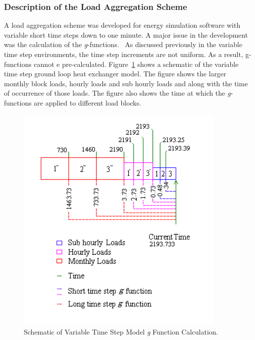 \subsubsection{Description of the Load Aggregation Scheme}\label{description-of-the-load-aggregation-scheme}

A load aggregation scheme was developed for energy simulation software with variable short time steps down to one minute. A major issue in the development was the calculation of the \emph{g}-functions.~ As discussed previously in the variable time step environments, the time step increments are not uniform. As a result, g-functions cannot e pre-calculated. Figure~\ref{fig:schematic-of-variable-time-step-model-g} shows a schematic of the variable time step ground loop heat exchanger model. The figure shows the larger monthly block loads, hourly loads and sub hourly loads and along with the time of occurrence of those loads. The figure also shows the time at which the \emph{g}-functions are applied to different load blocks.

\begin{figure}[hbtp] %
\centering
\includegraphics[width=0.9\textwidth, height=0.9\textheight, keepaspectratio=true]{media/image5656.png}
\caption{Schematic of Variable Time Step Model \emph{g} Function Calculation. \protect \label{fig:schematic-of-variable-time-step-model-g}}
\end{figure}

